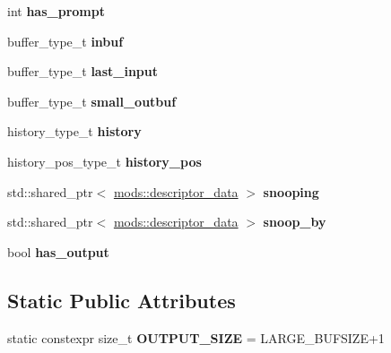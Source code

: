 \begin{DoxyCompactItemize}
int {\bfseries has\+\_\+prompt}
\item 
\mbox{\label{structmods_1_1descriptor__data_af343924d95ba2ef7c5f8d27f67aec0d8}} 
buffer\+\_\+type\+\_\+t {\bfseries inbuf}
\item 
\mbox{\label{structmods_1_1descriptor__data_a81138fa43848fce00be88c0a4260c235}} 
buffer\+\_\+type\+\_\+t {\bfseries last\+\_\+input}
\item 
\mbox{\label{structmods_1_1descriptor__data_a2fbdfc80434f9ddcfbc201ce1bb3c9d0}} 
buffer\+\_\+type\+\_\+t {\bfseries small\+\_\+outbuf}
\item 
\mbox{\label{structmods_1_1descriptor__data_a3be7e1b2136de152f07e9b9eb4d15a4b}} 
history\+\_\+type\+\_\+t {\bfseries history}
\item 
\mbox{\label{structmods_1_1descriptor__data_a762868b2bbe5d196e2f96f6519410c35}} 
history\+\_\+pos\+\_\+type\+\_\+t {\bfseries history\+\_\+pos}
\item 
\mbox{\label{structmods_1_1descriptor__data_aca845b188059fcb2dca343c4aefa01b7}} 
std\+::shared\+\_\+ptr$<$ \hyperlink{structmods_1_1descriptor__data}{mods\+::descriptor\+\_\+data} $>$ {\bfseries snooping}
\item 
\mbox{\label{structmods_1_1descriptor__data_a2fde30d575dbe31d606f899f715dabcf}} 
std\+::shared\+\_\+ptr$<$ \hyperlink{structmods_1_1descriptor__data}{mods\+::descriptor\+\_\+data} $>$ {\bfseries snoop\+\_\+by}
\item 
\mbox{\label{structmods_1_1descriptor__data_a584932baae36deb1ebc0285130dd52fa}} 
bool {\bfseries has\+\_\+output}
\end{DoxyCompactItemize}
\subsection*{Static Public Attributes}
\begin{DoxyCompactItemize}
\item 
\mbox{\label{structmods_1_1descriptor__data_a212ce7a6ea2d34242244f9517c1b0233}} 
static constexpr size\+\_\+t {\bfseries O\+U\+T\+P\+U\+T\+\_\+\+S\+I\+ZE} = L\+A\+R\+G\+E\+\_\+\+B\+U\+F\+S\+I\+ZE+1
\end{DoxyCompactItemize}


